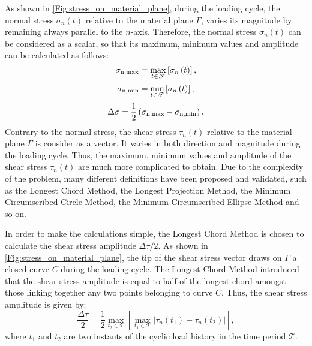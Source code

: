 As shown in \ref{Fig:stress_on_material_plane}, during the loading cycle, the normal stress ${{\sigma _{{{n}}}}(t)}$ relative to the material plane $\Gamma$, varies its magnitude by remaining always parallel to the $n$-axis. Therefore, the normal stress ${{\sigma _{{{n}}}}(t)}$ can be considered as a scalar, so that its maximum, minimum values and amplitude can be calculated as follows:
\begin{equation}
{\sigma _{{\rm{n,max}}}} = \mathop {\max }\limits_{t \in \mathscr{T}} \left[ {{\sigma _n}\left( t \right)} \right],
\end{equation}
\begin{equation}
{\sigma _{{\rm{n,min}}}} = \mathop {\min }\limits_{t \in \mathscr{T}} \left[ {{\sigma _n}\left( t \right)} \right],
\end{equation}
\begin{equation}
\Delta \sigma  = \frac{1}{2}\left( {{\sigma _{{\rm{n,max}}}} - {\sigma _{{\rm{n,min}}}}} \right).
\end{equation}
Contrary to the normal stress, the shear stress ${{\tau _{{{n}}}}(t)}$ relative to the material plane $\Gamma$ is consider as a vector. It varies in both direction and magnitude during the loading cycle.
Thus, the maximum, minimum values and amplitude of the shear stress ${{\tau _{{{n}}}}(t)}$ are much more complicated to obtain.
Due to the complexity of the problem, many different definitions have been proposed and validated, such as the Longest Chord Method\cite{Lemaitre1990Mechanics}, the Longest Projection Method, the Minimum Circumscribed Circle Method, the Minimum Circumscribed Ellipse Method and so on.

In order to make the calculations simple, the Longest Chord Method is chosen to calculate the shear stress amplitude $\Delta \tau/2$.
As shown in \ref{Fig:stress_on_material_plane}, the tip of the shear stress vector draws on $\Gamma$ a closed curve $C$ during the loading cycle.
The Longest Chord Method introduced that the shear stress amplitude is equal to half of the longest chord amongst those linking together any two points belonging to curve $C$. Thus, the shear stress amplitude is given by:
\begin{equation}
\frac{{\Delta \tau }}{2} = \frac{1}{2}\mathop {\max }\limits_{{t_2} \in \mathscr{T}} \left[ {\mathop {\max }\limits_{{t_1} \in \mathscr{T}} \left| {{\tau _{n}}\left( {{t_1}} \right) - {\tau _{n}}\left( {{t_2}} \right)} \right|} \right],
\end{equation}
where $t_1$ and $t_2$ are two instants of the cyclic load history in the time period $\mathscr{T}$.

